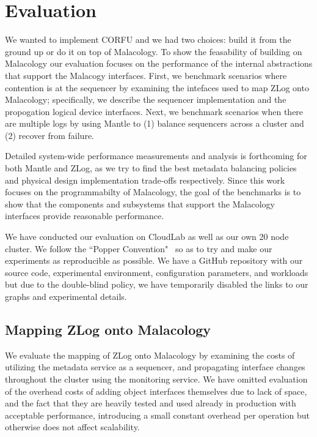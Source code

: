 \documentclass[preprint]{sigplanconf-eurosys}
\begin{document}
\section{Evaluation}
\label{evaluation} 

We wanted to implement CORFU and we had two choices: build it from the ground
up or do it on top of Malacology. To show the feasability of building on
Malacology our evaluation focuses on the performance of the internal
abstractions that support the Malacogy interfaces. First, we benchmark
scenarios where contention is at the sequencer by examining the intefaces used
to map ZLog onto Malacology; specifically, we describe the sequencer
implementation and the propogation logical device interfaces. Next, we
benchmark scenarios when there are multiple logs by using Mantle to (1)
balance sequencers across a cluster and (2) recover from failure.

Detailed system-wide performance measurements and analysis is forthcoming for
both Mantle and ZLog, as we try to find the best metadata balancing policies
and physical design implementation trade-offs respectively.  Since this work
focuses on the programmabilty of Malacology, the goal of the benchmarks is to
show that the components and subsystems that support the Malacology interfaces
provide reasonable performance.  

We have conducted our evaluation on CloudLab as well as our own 20 node
cluster. We follow the ``Popper Convention"~\cite{anonymous} so as to try and
make our experiments as reproducible as possible. We have a GitHub repository
with our source code, experimental environment, configuration parameters, and
workloads but due to the double-blind policy, we have temporarily disabled the
links to our graphs and experimental details.

\subsection{Mapping ZLog onto Malacology}
\label{mapping-zlog-onto-malacology}
We evaluate the mapping of ZLog onto Malacology by examining the costs of
utilizing the metadata service as a sequencer, and propagating interface
changes throughout the cluster using the monitoring service. We have omitted
evaluation of the overhead costs of adding object interfaces themselves due to
lack of space, and the fact that they are heavily tested and used already in
production with acceptable performance, introducing a small constant overhead
per operation but otherwise does not affect scalability.
\end{document}
